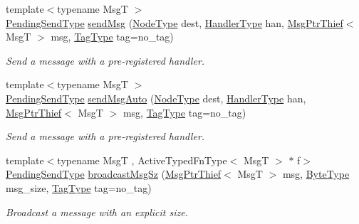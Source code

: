 \begin{DoxyCompactItemize}
{\footnotesize template$<$typename MsgT $>$ }\\\hyperlink{structvt_1_1messaging_1_1_active_messenger_a3626a6ca76d8ad4ec7c3b47a2c70d3a8}{Pending\+Send\+Type} \hyperlink{group__preregister_ga0162a39473e7f9b490a79a7983d949ac}{send\+Msg} (\hyperlink{namespacevt_a866da9d0efc19c0a1ce79e9e492f47e2}{Node\+Type} dest, \hyperlink{namespacevt_af64846b57dfcaf104da3ef6967917573}{Handler\+Type} han, \hyperlink{structvt_1_1messaging_1_1_msg_ptr_thief}{Msg\+Ptr\+Thief}$<$ MsgT $>$ msg, \hyperlink{namespacevt_a84ab281dae04a52a4b243d6bf62d0e52}{Tag\+Type} tag=no\+\_\+tag)
\begin{DoxyCompactList}\small\item\em Send a message with a pre-\/registered handler. \end{DoxyCompactList}\item 
{\footnotesize template$<$typename MsgT $>$ }\\\hyperlink{structvt_1_1messaging_1_1_active_messenger_a3626a6ca76d8ad4ec7c3b47a2c70d3a8}{Pending\+Send\+Type} \hyperlink{group__preregister_gad30a4e31445d40f9c3c36521fc04f975}{send\+Msg\+Auto} (\hyperlink{namespacevt_a866da9d0efc19c0a1ce79e9e492f47e2}{Node\+Type} dest, \hyperlink{namespacevt_af64846b57dfcaf104da3ef6967917573}{Handler\+Type} han, \hyperlink{structvt_1_1messaging_1_1_msg_ptr_thief}{Msg\+Ptr\+Thief}$<$ MsgT $>$ msg, \hyperlink{namespacevt_a84ab281dae04a52a4b243d6bf62d0e52}{Tag\+Type} tag=no\+\_\+tag)
\begin{DoxyCompactList}\small\item\em Send a message with a pre-\/registered handler. \end{DoxyCompactList}\item 
{\footnotesize template$<$typename MsgT , Active\+Typed\+Fn\+Type$<$ Msg\+T $>$ $\ast$ f$>$ }\\\hyperlink{structvt_1_1messaging_1_1_active_messenger_a3626a6ca76d8ad4ec7c3b47a2c70d3a8}{Pending\+Send\+Type} \hyperlink{group__typesafehan_ga3a74c8dddad6a829883e75a15164074f}{broadcast\+Msg\+Sz} (\hyperlink{structvt_1_1messaging_1_1_msg_ptr_thief}{Msg\+Ptr\+Thief}$<$ MsgT $>$ msg, \hyperlink{namespacevt_aab8d55968084610ce3b17057981e9300}{Byte\+Type} msg\+\_\+size, \hyperlink{namespacevt_a84ab281dae04a52a4b243d6bf62d0e52}{Tag\+Type} tag=no\+\_\+tag)
\begin{DoxyCompactList}\small\item\em Broadcast a message with an explicit size. \end{DoxyCompactList}\item 

\end{DoxyCompactItemize}
